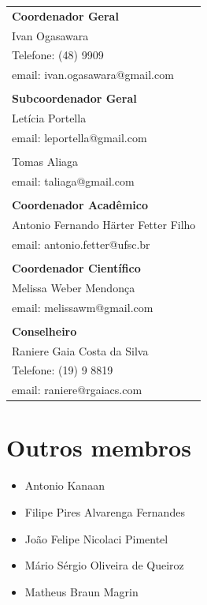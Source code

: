 \documentclass[a4paper,twocolumn,openright,article,12pt]{memoir}
\begin{document}
\begin{tabular}{l}
\bfseries{Coordenador Geral}\\
Ivan Ogasawara\\
Telefone: (48) 9909\textendash 0207\\
\makeatletter email: ivan.ogasawara@gmail.com\makeatother \\
\\
\bfseries{Subcoordenador Geral}\\
Letícia Portella\\
\makeatletter email: leportella@gmail.com \makeatother \\
\\
Tomas Aliaga\\
\makeatletter email: taliaga@gmail.com \makeatother \\
\\
\bfseries{Coordenador Acadêmico}\\
Antonio Fernando Härter Fetter Filho\\
\makeatletter email: antonio.fetter@ufsc.br \makeatother \\
\\
\bfseries{Coordenador Científico}\\
Melissa Weber Mendonça\\
\makeatletter email: melissawm@gmail.com \makeatother \\
\\
\bfseries{Conselheiro}\\
Raniere Gaia Costa da Silva\\
Telefone: (19) 9 8819\textendash 6817\\
\makeatletter email: raniere@rgaiacs.com \makeatother \\
\end{tabular}

\section*{Outros membros}

\begin{itemize}
\item Antonio Kanaan
\item Filipe Pires Alvarenga Fernandes
\item João Felipe Nicolaci Pimentel
\item Mário Sérgio Oliveira de Queiroz
\item Matheus Braun Magrin
\end{itemize}
\end{document}
